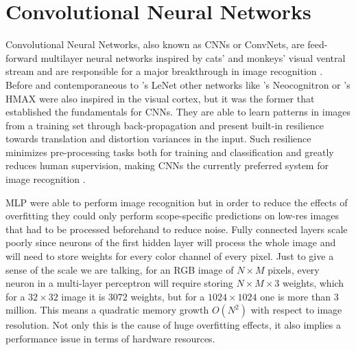 
\section{Convolutional Neural Networks}
\label{sec:theory:convnets}
Convolutional Neural Networks, also known as CNNs or ConvNets, are feed-forward multilayer neural networks inspired by cats' and monkeys' visual ventral stream \cite{Hubel1968,Lawrence1997} and are responsible for a major breakthrough in image recognition \cite{LeCun1995}.
Before and contemporaneous to \citeauthor{LeCun1998}'s LeNet \cite{LeCun1998} other networks like \citeauthor{Fukushima1980}'s Neocognitron \cite{Fukushima1980} or \citeauthor{Riesenhuber1999}'s HMAX \cite{Riesenhuber1999} were also inspired in the visual cortex, but it was the former that established the fundamentals for CNNs.
They are able to learn patterns in images from a training set through back-propagation and present built-in resilience towards translation and distortion variances in the input.
Such resilience minimizes pre-processing tasks both for training and classification and greatly reduces human supervision, making CNNs the currently preferred system for image recognition \cite{Visin2015}.

MLP were able to perform image recognition \cite{Zhang1999} but in order to reduce the effects of overfitting they could only perform scope-specific predictions on low-res images that had to be processed beforehand to reduce noise.
Fully connected layers scale poorly since neurons of the first hidden layer will process the whole image and will need to store weights for every color channel of every pixel.
Just to give a sense of the scale we are talking, for an RGB image of ${N}\times{M}$ pixels, every neuron in a multi-layer perceptron will require storing ${N}\times{M}\times{3}$ weights, which for a ${32}\times{32}$ image it is $3072$ weights, but for a ${1024}\times{1024}$ one is more than $3$ million.
This means a quadratic memory growth $O(N^2)$ with respect to image resolution.
Not only this is the cause of huge overfitting effects, it also implies a performance issue in terms of hardware resources.

